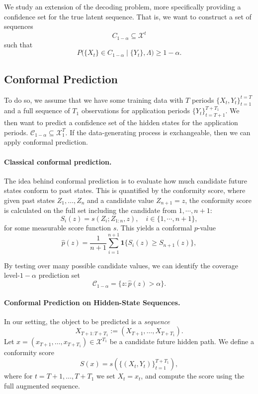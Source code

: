 \documentclass{article}
\begin{document}
We study an extension of the decoding problem, more specifically providing a confidence set for
the true latent sequence. That is, we want to construct a set of sequences
\[
C_{1-\alpha} \subseteq \mathcal{X}^{t}
\]
such that
\[
P\big(\{X_t\} \in C_{1-\alpha} \mid \{Y_t\}, \Lambda \big) \ge 1 - \alpha .
\]

\subsection{Conformal Prediction}

To do so, we assume that we have some training data with $T$ periods $\{X_t, Y_t\}_{t=1}^{t=T}$ and a full sequence of $T_1$ observations for application periods $\{Y_t\}_{t=T+1}^{T + T_1}$. We then want to predict a confidence set of the hidden states for the application periods. $\mathcal{C}_{1-\alpha} \subseteq \mathcal{X}^T_1$. If the data-generating process is exchangeable, then we can apply conformal prediction.

\paragraph{Classical conformal prediction.}
The idea behind conformal prediction is to evaluate how much candidate future states conform to past states. This is quantified by the conformity score, where given past states $Z_1,\dots,Z_n$ and a candidate value $Z_{n+1}=z$, the conformity score is calculated on the full set including the candidate from $1,\cdots,n+1$:
\[
S_i(z) = s(Z_i; Z_{1:n}, z), \quad i \in \{1, \cdots, n+1\},
\]
for some measurable score function $s$. This yields a conformal $p$-value
\[
\hat p(z)
=
\frac{1}{n+1}
\sum_{i=1}^{n+1}
\mathbf 1\{S_i(z)\ge S_{n+1}(z)\},
\]

By testing over many possible candidate values, we can identify the coverage level-$1-\alpha$ prediction set
\[
\mathcal C_{1-\alpha}
=
\{z:\hat p(z)>\alpha\}.
\]

\paragraph{Conformal Prediction on Hidden-State Sequences.}
In our setting, the object to be predicted is a \emph{sequence}
\[
X_{T+1:T+T_1}
:=
(X_{T+1},\dots,X_{T+T_1}).
\]
Let $x = (x_{T+1},\dots,x_{T+T_1}) \in \mathcal X^{T_1}$ be a candidate future hidden path.
We define a conformity score
\[
S(x)
=
s\!\left(
\{(X_t,Y_t)\}_{t=1}^{T+T_1}
\right),
\]
where for $t=T+1,\dots,T+T_1$ we set $X_t = x_t$, and compute the score using the full augmented sequence.
\end{document}
